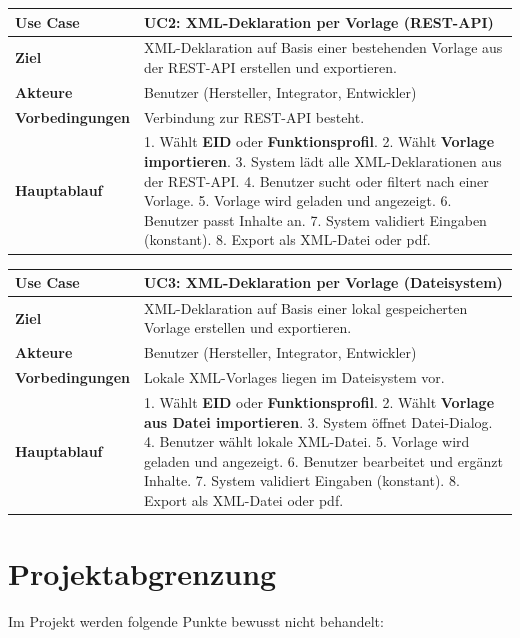 \documentclass[a4paper,12pt]{article}
\begin{document}
\begin{table}[h!]
\centering
\renewcommand{\arraystretch}{1.2}
\begin{tabularx}{\textwidth}{|l|X|}
\hline
\textbf{Use Case} & \textbf{UC2: XML-Deklaration per Vorlage (REST-API)} \\ \hline
\textbf{Ziel} & XML-Deklaration auf Basis einer bestehenden Vorlage aus der REST-API erstellen und exportieren. \\ \hline
\textbf{Akteure} & Benutzer (Hersteller, Integrator, Entwickler) \\ \hline
\textbf{Vorbedingungen} & Verbindung zur REST-API besteht. \\ \hline
\textbf{Hauptablauf} & 
1. Wählt \textbf{EID} oder \textbf{Funktionsprofil}. 2. Wählt \textbf{Vorlage importieren}. 3. System lädt alle XML-Deklarationen aus der REST-API. 4. Benutzer sucht oder filtert nach einer Vorlage. 5. Vorlage wird geladen und angezeigt. 6. Benutzer passt Inhalte an. 7. System validiert Eingaben (konstant). 8. Export als XML-Datei oder pdf. \\ \hline
\end{tabularx}
\end{table}


\begin{table}[h!]
\centering
\renewcommand{\arraystretch}{1.2}
\begin{tabularx}{\textwidth}{|l|X|}
\hline
\textbf{Use Case} & \textbf{UC3: XML-Deklaration per Vorlage (Dateisystem)} \\ \hline
\textbf{Ziel} & XML-Deklaration auf Basis einer lokal gespeicherten Vorlage erstellen und exportieren. \\ \hline
\textbf{Akteure} & Benutzer (Hersteller, Integrator, Entwickler) \\ \hline
\textbf{Vorbedingungen} & Lokale XML-Vorlages liegen im Dateisystem vor. \\ \hline
\textbf{Hauptablauf} &
1. Wählt \textbf{EID} oder \textbf{Funktionsprofil}. 2. Wählt \textbf{Vorlage aus Datei importieren}. 3. System öffnet Datei-Dialog. 4. Benutzer wählt lokale XML-Datei. 5. Vorlage wird geladen und angezeigt. 6. Benutzer bearbeitet und ergänzt Inhalte. 7. System validiert Eingaben (konstant). 8. Export als XML-Datei oder pdf. \\ \hline
\end{tabularx}
\end{table}


\newpage

\section{Projektabgrenzung}
Im Projekt werden folgende Punkte bewusst nicht behandelt:
\end{document}
